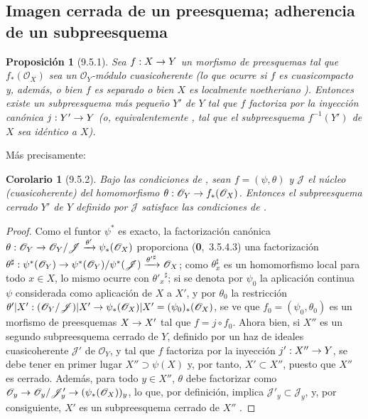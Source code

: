 \documentclass[oneside]{amsart}
\theoremstyle{ega-env-style}
\theoremstyle{ega-thm-env-style}
\newtheorem*{proposition}{Proposición}
\newtheorem*{corollary}{Corolario}
\theoremstyle{ega-defn-env-style}
\renewcommand{\to}{\mathchoice{\longrightarrow}{\rightarrow}{\rightarrow}{\rightarrow}}
\newcommand{\oldpage}[2][]{{\marginnote{\normalfont{\textbf{#1}~|~#2}}}\ignorespaces}
\let\EGAOriginalLabel\label
\renewcommand{\label}[1]{\phantomsection\EGAOriginalLabel{#1}}
\newcommand{\erratum}[2][]{{#2}\marginpar{\footnotesize\textbf{Err}\textsubscript{#1}}}
\begin{document}
\subsection{Imagen cerrada de un preesquema; adherencia de un subpreesquema}
\label{subsection:I.9.5}

\begin{proposition}[9.5.1]
\label{I.9.5.1}
Sea $f:X\to Y$ un morfismo de preesquemas tal que $f_*(\mathscr{O}_X)$ sea un
$\mathscr{O}_Y$-módulo cuasicoherente (lo que ocurre si $f$ es cuasicompacto y, además,
o bien $f$ es separado o bien $X$ es localmente noetheriano ). Entonces
existe un subpreesquema más pequeño $Y'$ de $Y$ tal que $f$ factoriza por la inyección
canónica $j:Y'\to Y$ \textup{(o, equivalentemente , tal que el
subpreesquema $f^{-1}(Y')$ de $X$ sea \emph{idéntico a} $X$)}.
\end{proposition}

Más precisamente:
\begin{corollary}[9.5.2]
\label{I.9.5.2}
Bajo las condiciones de , sean $f=(\psi,\theta)$ y $\mathscr{J}$ el
núcleo (cuasicoherente) del homomorfismo $\theta:\mathscr{O}_Y\to f_*(\mathscr{O}_X)$. Entonces el
subpreesquema cerrado $Y'$ de $Y$ definido por $\mathscr{J}$ satisface las condiciones de
.
\end{corollary}

\begin{proof}
Como el funtor $\psi^*$ es exacto, la factorización canónica
$\theta:\mathscr{O}_Y\to\mathscr{O}_Y/\mathscr{J}
\xrightarrow{\theta'}\psi_*(\mathscr{O}_X)$ proporciona (\textbf{0},~3.5.4.3)
una factorización
$\theta^\sharp:\psi^*(\mathscr{O}_Y)
\to\psi^*(\mathscr{O}_Y)/\psi^*(\mathscr{J})
\xrightarrow{{\theta'}^\sharp}\mathscr{O}_X$; como $\theta_x^\sharp$ es un homomorfismo local para
todo $x\in X$, lo mismo ocurre con ${\theta'_x}^\sharp$; si se denota por $\psi_0$ la
aplicación continua $\psi$ considerada como aplicación de $X$ a \erratum[II]{$X'$}, y por $\theta_0$ la restricción
$\theta'|X':(\mathscr{O}_Y/\mathscr{J})|X'
\to\psi_*(\mathscr{O}_X)|X'=(\psi_0)_*(\mathscr{O}_X)$, se ve que
$f_0=(\psi_0,\theta_0)$ es un morfismo de preesquemas $X\to X'$  tal que
$f=j\circ f_0$. Ahora bien, si $X''$
\oldpage[I]{177}
es un segundo subpreesquema cerrado de $Y$, definido por un haz de ideales cuasicoherente $\mathscr{J}'$ de
$\mathscr{O}_Y$, y tal que $f$ factoriza por la inyección $j':X''\to Y$, se debe tener en primer lugar $X''\supset\psi(X)$ y, por tanto, $X'\subset X''$, puesto que $X''$ es cerrado.
Además, para todo $y\in X''$, $\theta$ debe factorizar como
$\mathscr{O}_y\to\mathscr{O}_y/\mathscr{J}'_y
\to(\psi_*(\mathscr{O}_X))_y$, lo que, por definición, implica
$\mathscr{J}'_y\subset\mathscr{J}_y$, y, por consiguiente, $X'$ es un subpreesquema cerrado de $X''$
.
\end{proof}
\end{document}
